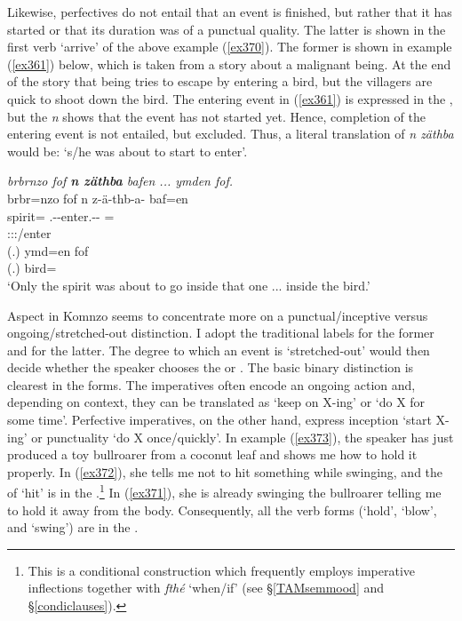 Likewise, perfectives do not entail that an event is finished, but rather that it has started or that its duration was of a punctual quality. The latter is shown in the first verb `arrive' of the above example (\ref{ex370}). The former is shown in example (\ref{ex361}) below, which is taken from a story about a malignant being. At the end of the story that being tries to escape by entering a bird, but the villagers are quick to shoot down the bird. The entering event in (\ref{ex361}) is expressed in the , but the   \emph{n} shows that the event has not started yet. Hence, completion of the entering event is not entailed, but excluded. Thus, a literal translation of \emph{n zäthba} would be: `s/he was about to start to enter'.

\begin{exe}
	\ex \emph{brbrnzo fof \textbf{n zäthba} bafen ... ymden fof.}\\
	\glll brbr=nzo fof n z-ä-thb-a-\Zero{} baf=en \\
	spirit=\Only{} \Emph{} \Imn{} \Med.\Gam-\Ndu-enter.\Rs-\Pst-\Stsg{} \Recog=\Loc{}\\
	{} {} {} \footnotesize{\Stsg:\Sbj:\Pst:\Pfv/enter} {}\\
	\sn
	\gll (.) ymd=en fof\\
	(.) bird=\Loc{} \Emph{}\\
	\trans `Only the spirit was about to go inside that one ... inside the bird.'\\
	\label{ex361}
\end{exe}

Aspect in Komnzo seems to concentrate more on a punctual/inceptive versus ongoing/stretched-out distinction. I adopt the traditional labels  for the former and  for the latter. The degree to which an event is `stretched-out' would then decide whether the speaker chooses the  or  . The basic binary distinction is clearest in the  forms. The  imperatives often encode an ongoing action and, depending on context, they can be translated as `keep on X-ing' or `do X for some time'. Perfective imperatives, on the other hand, express inception `start X-ing' or punctuality `do X once/quickly'. In example (\ref{ex373}), the speaker has just produced a toy bullroarer from a coconut leaf and shows me how to hold it properly. In (\ref{ex372}), she tells me not to hit something while swinging, and the  of `hit' is in the .\footnote{This is a conditional construction which frequently employs imperative inflections together with \emph{fthé} `when/if' (see \S{}\ref{TAMsemmood} and \S\ref{condiclauses}).} In (\ref{ex371}), she is already swinging the bullroarer telling me to hold it away from the body. Consequently, all the  verb forms (`hold', `blow', and `swing') are in the .

